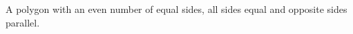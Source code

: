         A polygon with an even number of equal sides, all sides equal
and opposite sides parallel.
	